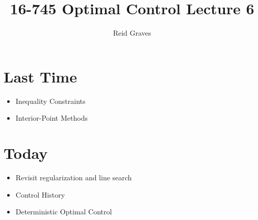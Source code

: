 \documentclass[11pt]{article}
\title{16-745 Optimal Control Lecture 6}
\author{Reid Graves}
\begin{document}
\maketitle

\section{Last Time}
\begin{itemize}
    \item Inequality Constraints
    \item Interior-Point Methods
\end{itemize}

\section{Today}
\begin{itemize}
    \item Revisit regularization and line search
    \item Control History
    \item Deterministic Optimal Control
\end{itemize}
\end{document}
